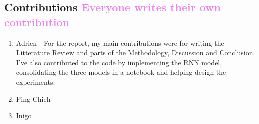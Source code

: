\documentclass[12pt, letterpaper]{article}
\begin{document}
\subsection*{Contributions \textcolor{violet}{Everyone writes their own contribution}}
\begin{enumerate}
    \item Adrien - 
        For the report, my main contributions were for writing the Litterature Review and parts of the Methodology, Discussion and Conclusion. I've also contributed to the code by implementing the RNN model, consolidating the three models in a notebook and helping design the experiments.
    \item Ping-Chieh
    \item Inigo
\end{enumerate}

\pagebreak
\end{document}
